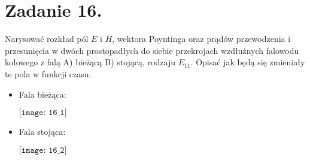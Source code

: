 \section*{Zadanie 16.}
\begin{task}
Narysować rozkład pól $E$ i $H$, wektora Poyntinga oraz prądów przewodzenia i przesunięcia w dwóch prostopadłych do siebie przekrojach wzdłużnych falowodu kołowego z falą A) bieżącą B) stojącą, rodzaju $E_{11}$. Opisać  jak będą się zmieniały te pola w funkcji czasu.\\
\end{task}

\begin{solution}

\begin{itemize}
	\item Fala bieżąca:
	\begin{center}
	$\texttt{[image: 16\_1]}$\\
	\end{center}
	\item Fala stojąca:\\
	
	
	\begin{center}
	$\texttt{[image: 16\_2]}$\\
	\end{center}
\end{itemize}
\end{solution}